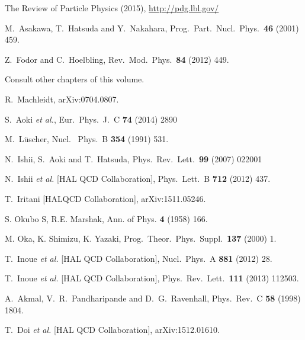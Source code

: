 \begin{thebibliography}{99.}
The Review of Particle Physics (2015), \url{http://pdg.lbl.gov/ } 
  
  M.~Asakawa, T.~Hatsuda and Y.~Nakahara,
  Prog.\ Part.\ Nucl.\ Phys.\  {\bf 46} (2001) 459.

  
  Z.~Fodor and C.~Hoelbling, Rev.\ Mod.\ Phys.\  {\bf 84} (2012) 449.
   
Consult other chapters of this volume.
 
  R.~Machleidt, arXiv:0704.0807.

  S.~Aoki {\it et al.},
  Eur.\ Phys.\ J.\ C {\bf 74} (2014) 2890

 M.~L\"{u}scher, Nucl. \ Phys.\ B {\bf 354} (1991) 531.

N.~Ishii, S.~Aoki and T.~Hatsuda,
Phys.\ Rev.\ Lett.\  {\bf 99} (2007) 022001

  N.~Ishii {\it et al.} [HAL QCD Collaboration],
 Phys.\ Lett.\ B {\bf 712} (2012) 437.

T.~Iritani [HALQCD Collaboration], arXiv:1511.05246.

S. Okubo S, R.E. Marshak, Ann. of Phys. {\bf 4} (1958) 166.

M. Oka, K. Shimizu, K. Yazaki, Prog.\ Theor.\ Phys.\ Suppl.\  {\bf 137}  (2000) 1.  

  T.~Inoue {\it et al.} [HAL QCD Collaboration],
  Nucl.\ Phys.\ A {\bf 881} (2012) 28.
  
  T.~Inoue {\it et al.} [HAL QCD Collaboration],
  Phys.\ Rev.\ Lett.\  {\bf 111} (2013)  112503.
  
  A.~Akmal, V.~R.~Pandharipande and D.~G.~Ravenhall,
  Phys.\ Rev.\ C {\bf 58} (1998) 1804.
  
  T.~Doi {\it et al.} [HAL QCD Collaboration], arXiv:1512.01610.
 


  
\end{thebibliography}
